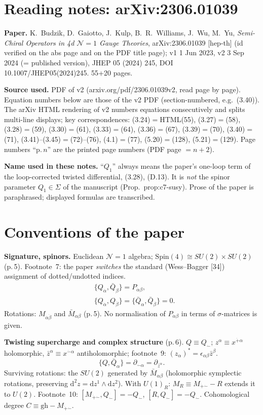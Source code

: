 \documentclass[11pt]{article}
\newcommand{\dm}{\dot{-}}
\newcommand{\dpl}{\dot{+}}
\begin{document}
\section*{Reading notes: arXiv:2306.01039}

\textbf{Paper.} K.~Budzik, D.~Gaiotto, J.~Kulp, B.~R.~Williams, J.~Wu, M.~Yu, \emph{Semi-Chiral Operators in 4d $\mathcal N=1$ Gauge Theories}, arXiv:2306.01039 [hep-th] (id verified on the abs page and on the PDF title page); v1 1 Jun 2023, v2 3 Sep 2024 (= published version), JHEP 05 (2024) 245, DOI 10.1007/JHEP05(2024)245. 55+20 pages.

\textbf{Source used.} PDF of v2 (arxiv.org/pdf/2306.01039v2, read page by page). Equation numbers below are those of the v2 PDF (section-numbered, e.g.\ (3.40)). The arXiv HTML rendering of v2 numbers equations consecutively and splits multi-line displays; key correspondences: (3.24)$=$HTML(55), (3.27)$=$(58), (3.28)$=$(59), (3.30)$=$(61), (3.33)$=$(64), (3.36)$=$(67), (3.39)$=$(70), (3.40)$=$(71), (3.41)--(3.45)$=$(72)--(76), (4.1)$=$(77), (5.20)$=$(128), (5.21)$=$(129). Page numbers ``p.\,$n$'' are the printed page numbers (PDF page $=n+2$).

\textbf{Name used in these notes.} ``$Q_1$'' always means the paper's one-loop term of the loop-corrected twisted differential, (3.28), (D.13). It is \emph{not} the spinor parameter $Q_1\in\Sigma$ of the manuscript (Prop.~prop:c7-susy). Prose of the paper is paraphrased; displayed formulas are transcribed.

\section{Conventions of the paper}

\textbf{Signature, spinors.} Euclidean $\mathcal N=1$ algebra; $\mathrm{Spin}(4)\cong SU(2)\times SU(2)$ (p.\,5). Footnote~7: the paper \emph{switches} the standard (Wess--Bagger [34]) assignment of dotted/undotted indices.
\begin{align}
&\{Q_{\dot\alpha},\bar Q_\beta\}=P_{\dot\alpha\beta}, \tag{2.1}\\
&\{Q_{\dot\alpha},Q_{\dot\beta}\}=\{\bar Q_\alpha,\bar Q_\beta\}=0 . \tag{2.2}
\end{align}
Rotations: $M_{\dot\alpha\dot\beta}$ and $\bar M_{\alpha\beta}$ (p.\,5). No normalisation of $P_{\dot\alpha\beta}$ in terms of $\sigma$-matrices is given.

\textbf{Twisting supercharge and complex structure} (p.\,6). $Q\equiv Q_{\dm}$; $z^\alpha\equiv x^{\dpl\alpha}$ holomorphic, $\bar z^\alpha\equiv x^{\dm\alpha}$ antiholomorphic; footnote~9: $(z_\alpha)^*=\epsilon_{\alpha\beta}\bar z^\beta$.
\begin{equation}
\{Q,\bar Q_\alpha\}=\partial_{\dm\alpha}=\partial_{\bar z^\alpha} . \tag{2.3}
\end{equation}
Surviving rotations: the $SU(2)$ generated by $\bar M_{\alpha\beta}$ (holomorphic symplectic rotations, preserving $\mathrm d^2z=\mathrm dz^1\wedge\mathrm dz^2$). With $U(1)_R$: $M_R\equiv M_{\dpl\dm}-R$ extends it to $U(2)$. Footnote~10: $[M_{\dpl\dm},Q_{\dm}]=-Q_{\dm}$, $[R,Q_{\dm}]=-Q_{\dm}$. Cohomological degree $C\equiv \mathrm{gh}-M_{\dpl\dm}$.
\end{document}
